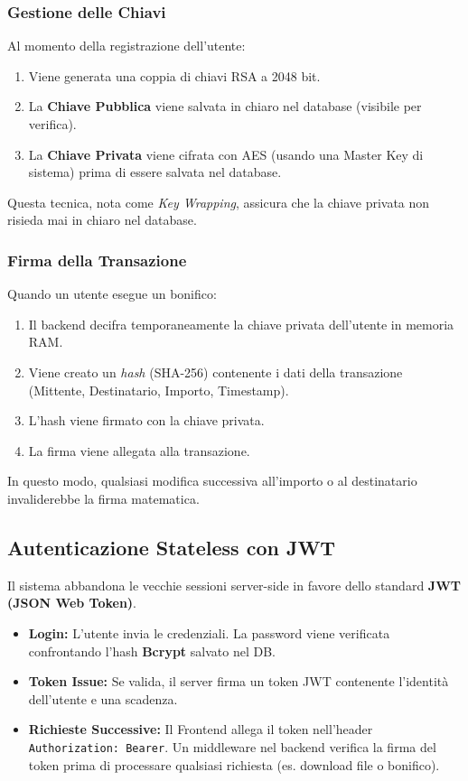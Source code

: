 \documentclass[a4paper, 12pt, titlepage]{article}
\begin{document}
\subsubsection{Gestione delle Chiavi}
Al momento della registrazione dell'utente:
\begin{enumerate}
    \item Viene generata una coppia di chiavi RSA a 2048 bit.
    \item La \textbf{Chiave Pubblica} viene salvata in chiaro nel database (visibile per verifica).
    \item La \textbf{Chiave Privata} viene cifrata con AES (usando una Master Key di sistema) prima di essere salvata nel database.
\end{enumerate}
Questa tecnica, nota come \textit{Key Wrapping}, assicura che la chiave privata non risieda mai in chiaro nel database.

\subsubsection{Firma della Transazione}
Quando un utente esegue un bonifico:
\begin{enumerate}
    \item Il backend decifra temporaneamente la chiave privata dell'utente in memoria RAM.
    \item Viene creato un \textit{hash} (SHA-256) contenente i dati della transazione (Mittente, Destinatario, Importo, Timestamp).
    \item L'hash viene firmato con la chiave privata.
    \item La firma viene allegata alla transazione.
\end{enumerate}
In questo modo, qualsiasi modifica successiva all'importo o al destinatario invaliderebbe la firma matematica.

\subsection{Autenticazione Stateless con JWT}
Il sistema abbandona le vecchie sessioni server-side in favore dello standard \textbf{JWT (JSON Web Token)}.
\begin{itemize}
    \item \textbf{Login:} L'utente invia le credenziali. La password viene verificata confrontando l'hash \textbf{Bcrypt} salvato nel DB.
    \item \textbf{Token Issue:} Se valida, il server firma un token JWT contenente l'identità dell'utente e una scadenza.
    \item \textbf{Richieste Successive:} Il Frontend allega il token nell'header \texttt{Authorization: Bearer}. Un middleware nel backend verifica la firma del token prima di processare qualsiasi richiesta (es. download file o bonifico).
\end{itemize}
\end{document}
